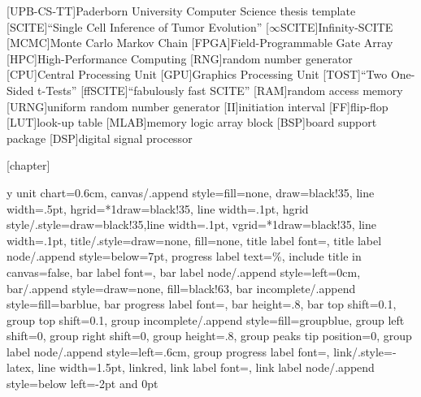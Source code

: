 \theoremstyle{definition}
\newtheorem{definition}{Definition}[chapter]
\newtheorem{example}[definition]{Example}

\theoremstyle{plain}
\newtheorem{remark}[definition]{Remark}
\newtheorem{lemma}[definition]{Lemma}
\newtheorem{theorem}[definition]{Theorem}
\newtheorem{corollary}[definition]{Corollary}


\newcommand*{\eg}{e.\,g.}
\newcommand*{\ie}{i.\,e.}
\newcommand*{\cf}{c.\,f.}
\newcommand*{\etal}{et~al.}

[UPB-CS-TT]{Paderborn University Computer Science thesis template}
[SCITE]{``Single Cell Inference of Tumor Evolution''}
[$\infty$SCITE]{Infinity-SCITE}
[MCMC]{Monte Carlo Markov Chain}
[FPGA]{Field-Programmable Gate Array}
[HPC]{High-Performance Computing}
[RNG]{random number generator}
[CPU]{Central Processing Unit}
[GPU]{Graphics Processing Unit}
[TOST]{``Two One-Sided t-Tests''}
[ffSCITE]{``fabulously fast SCITE''}
[RAM]{random access memory}
[URNG]{uniform random number generator}
[II]{initiation interval}
[FF]{flip-flop}
[LUT]{look-up table}
[MLAB]{memory logic array block}
[BSP]{board support package}
[DSP]{digital signal processor}

\DeclareMathOperator*{\argmax}{arg\,max}
\DeclareMathOperator*{\argmin}{arg\,min}


[chapter]

\ganttset
{%
	y unit chart=0.6cm,
	canvas/.append style={fill=none, draw=black!35, line width=.5pt},
	hgrid={*1{draw=black!35, line width=.1pt}},
	hgrid style/.style={draw=black!35,line width=.1pt},
	vgrid={*1{draw=black!35, line width=.1pt}},
	title/.style={draw=none, fill=none},
	title label font=\footnotesize,
	title label node/.append style={below=7pt},
	progress label text={\%},
	include title in canvas=false,
	bar label font=\small,
	bar label node/.append style={left=0cm},
	bar/.append style={draw=none, fill=black!63},
	bar incomplete/.append style={fill=barblue},
	bar progress label font=\footnotesize\color{black!70},
	bar height=.8,
	bar top shift=0.1,
	group top shift=0.1,
	group incomplete/.append style={fill=groupblue},
	group left shift=0,
	group right shift=0,
	group height=.8,
	group peaks tip position=0,
	group label node/.append style={left=.6cm},
	group progress label font=\small,
	link/.style={-latex, line width=1.5pt, linkred},
	link label font=\scriptsize,
	link label node/.append style={below left=-2pt and 0pt}
}

